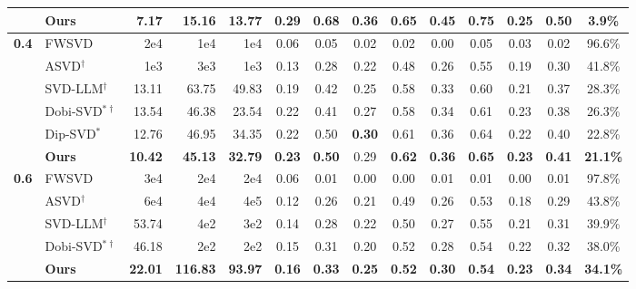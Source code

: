 \begin{table}[t]
{\begin{tabular}{l l
                r r r | 
                c c c c c c
                c c c}
\rowcolor{gray!12}
& \textbf{Ours}  & \textbf{7.17}  & \textbf{15.16}   & \textbf{13.77} & \textbf{0.29} & \textbf{0.68} & \textbf{0.36} & 0.65 & \textbf{0.45} & \textbf{0.75} & \textbf{0.25} & \textbf{0.50} & \textbf{3.9\%} \\
\midrule
\multirow{6}{*}{\textbf{0.4}}
& FWSVD         & 2e4 & 1e4 & 1e4 & 0.06  & 0.05  & 0.02  & 0.02  & 0.00  & 0.05  & 0.03  & 0.02 & 96.6\% \\
& ASVD$^\dagger$            & 1e3  & 3e3 & 1e3  & 0.13  & 0.28  & 0.22  & 0.48  & 0.26  & 0.55  & 0.19  & 0.30 & 41.8\% \\
& SVD-LLM$^\dagger$ & 13.11 & 63.75 & 49.83 & 0.19  & 0.42  & 0.25  & 0.58  & 0.33  & 0.60  & 0.21  & 0.37 & 28.3\% \\
& Dobi\mbox{-}SVD$^{*\dagger}$ & 13.54 & 46.38 & 23.54 & 0.22  & 0.41  & 0.27  & 0.58  & 0.34  & 0.61  & 0.23  & 0.38 & 26.3\% \\
& Dip\mbox{-}SVD$^{*}$  & 12.76 & 46.95 & 34.35 & 0.22 & 0.50 & \textbf{0.30} & 0.61 & 0.36 & 0.64  & 0.22 & 0.40 & 22.8\% \\
\rowcolor{gray!12}
& \textbf{Ours}  & \textbf{10.42} & \textbf{45.13}   & \textbf{32.79} & \textbf{0.23}   & \textbf{0.50}   & 0.29   & \textbf{0.62}   & \textbf{0.36}   & \textbf{0.65}   & \textbf{0.23 }  & \textbf{0.41} & \textbf{21.1\%} \\
\midrule
\multirow{5}{*}{\textbf{0.6}}
& FWSVD         & 3e4 & 2e4 & 2e4   & 0.06  & 0.01  & 0.00  & 0.00  & 0.01  & 0.01  & 0.00  & 0.01 & 97.8\% \\
& ASVD$^\dagger$            & 6e4 & 4e4 & 4e5 & 0.12  & 0.26  & 0.21  & 0.49  & 0.26  & 0.53  & 0.18  & 0.29 & 43.8\% \\
& SVD-LLM$^\dagger$ & 53.74 & 4e2 & 3e2 & 0.14  & 0.28  & 0.22  & 0.50  & 0.27  & 0.55  & 0.21  & 0.31 & 39.9\% \\
& Dobi\mbox{-}SVD$^{*\dagger}$ & 46.18 & 2e2 & 2e2 & 0.15  & 0.31  & 0.20  & 0.52  & 0.28  & 0.54  & 0.22  & 0.32 & 38.0\% \\
\rowcolor{gray!12}
& \textbf{Ours}  & \textbf{22.01} & \textbf{116.83} & \textbf{93.97} & \textbf{0.16}  & \textbf{0.33} & \textbf{0.25}  & \textbf{0.52} & \textbf{0.30} & \textbf{0.54} & \textbf{0.23} & \textbf{0.34} & \textbf{34.1\%} \\
\bottomrule
\end{tabular}
}
\label{tab main}
\end{table}


